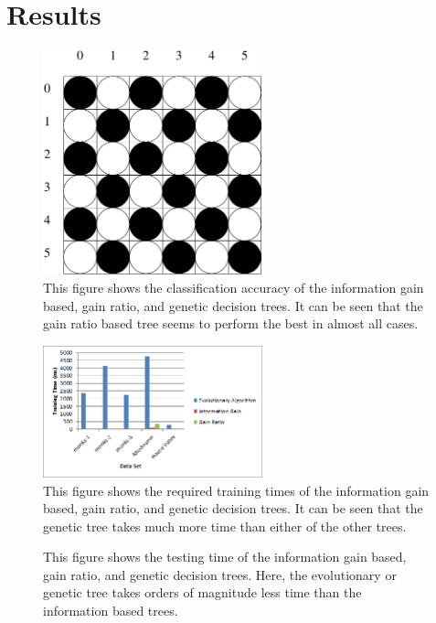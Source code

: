 \documentclass[12pt, letterpaper]{article}
\begin{document}
\section{Results}
\begin{figure}
\begin{center}
\includegraphics[width=2.5in]{images/konane1.pdf}
\end{center}
\caption{This figure shows the classification accuracy of the information gain
based, gain ratio, and genetic decision trees.  It can be seen that the gain 
ratio based tree seems to perform the best in almost all cases.}
\label{Classification Accuracies of Multiple Decision Trees}
\end{figure}

\begin{figure}
\begin{center}
\includegraphics[width=2.5in]{images/algorithm_comparison_training_time.png}
\end{center}
\caption{This figure shows the required training times of the information gain
based, gain ratio, and genetic decision trees.  It can be seen that the genetic
tree takes much more time than either of the other trees.}
\label{Training Times of Multiple Decision Trees}
\end{figure}

\begin{figure}
\begin{center}
\end{center}
\caption{This figure shows the testing time of the information gain
based, gain ratio, and genetic decision trees.  Here, the evolutionary or 
genetic tree takes orders of magnitude less time than the information based
trees.}
\label{Testing Times of Multiple Decision Trees}
\end{figure}
\end{document}
